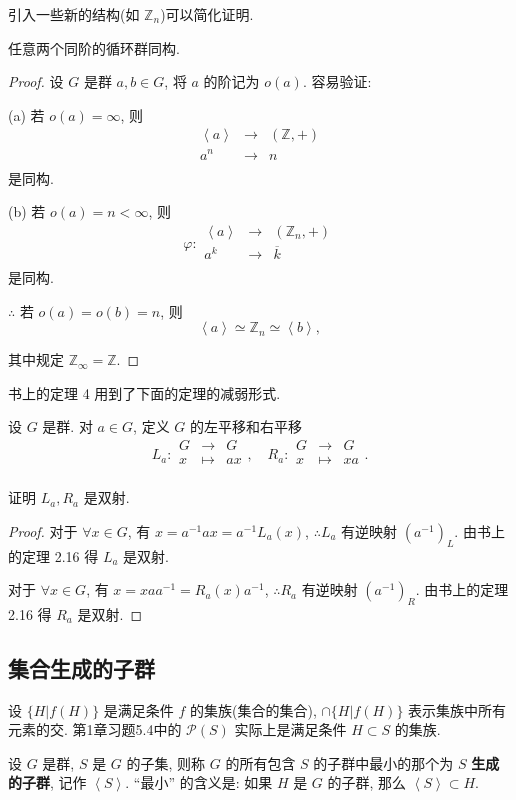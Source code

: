 \documentclass[color=black,device=normal,lang=cn,mode=geye]{elegantnote}
\begin{document}
引入一些新的结构(如 $\mathbb{Z}_n$)可以简化证明.
\begin{theorem}[书上的定理 3]
    任意两个同阶的循环群同构.
\end{theorem}
\begin{proof}
    设 $G$ 是群 $a,b\in G$, 将 $a$ 的阶记为 $o(a)$. 容易验证:

    (a) 若 $o(a)=\infty$, 则
    \[\begin{array}{rcl}
        \left<a\right> & \to & (\mathbb{Z},+) \\
        a^n & \to & n \\
    \end{array}\]
    是同构.

    (b) 若 $o(a)=n<\infty$, 则
    \[\varphi:\begin{array}{rcl}
        \left<a\right> & \to & (\mathbb{Z}_n,+) \\
        a^k & \to & \overline{k} \\
    \end{array}\]
    是同构.

    $\therefore$ 若 $o(a)=o(b)=n$, 则
    \[\left<a\right>\simeq\mathbb{Z}_n\simeq\left<b\right>,\]

    其中规定 $\mathbb{Z}_\infty=\mathbb{Z}$.
\end{proof}

书上的定理 4 用到了下面的定理的减弱形式.
\begin{theorem}\label{t2.5}
    设 $G$ 是群. 对 $a\in G$, 定义 $G$ 的左平移和右平移
    \[L_a:\begin{array}{rcl}
        G & \to & G \\
        x & \mapsto & ax \\
    \end{array},\quad R_a:\begin{array}{rcl}
        G & \to & G \\
        x & \mapsto & xa \\
    \end{array}.\]

    证明 $L_a,R_a$ 是双射.
\end{theorem}
\begin{proof}
    对于 $\forall x\in G$, 有 $x=a^{-1}ax=a^{-1}L_a(x)$, $\therefore L_a$ 有逆映射 $(a^{-1})_L$. 由书上的定理 2.16 得 $L_a$ 是双射.

    对于 $\forall x\in G$, 有 $x=xaa^{-1}=R_a(x)a^{-1}$, $\therefore R_a$ 有逆映射 $(a^{-1})_R$. 由书上的定理 2.16 得 $R_a$ 是双射.
\end{proof}
\subsection{集合生成的子群}
设 $\{H|f(H)\}$ 是满足条件 $f$ 的集族(集合的集合), $\cap\{H|f(H)\}$ 表示集族中所有元素的交. 第1章习题5.4中的 $\mathcal{P}(S)$ 实际上是满足条件 $H\subset S$ 的集族.
\begin{definition}
    设 $G$ 是群, $S$ 是 $G$ 的子集, 则称 $G$ 的所有包含 $S$ 的子群中最小的那个为 $S$ \textbf{生成的子群}, 记作 $\left<S\right>$. ``最小'' 的含义是: 如果 $H$ 是 $G$ 的子群, 那么 $\left<S\right>\subset H$.
\end{definition}
\end{document}
